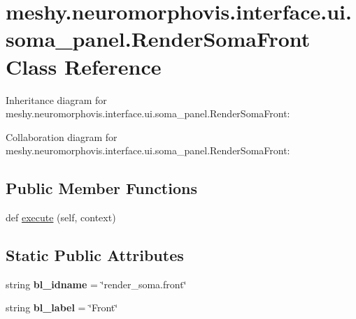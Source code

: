 \hypertarget{classmeshy_1_1neuromorphovis_1_1interface_1_1ui_1_1soma__panel_1_1RenderSomaFront}{}\section{meshy.\+neuromorphovis.\+interface.\+ui.\+soma\+\_\+panel.\+Render\+Soma\+Front Class Reference}
\label{classmeshy_1_1neuromorphovis_1_1interface_1_1ui_1_1soma__panel_1_1RenderSomaFront}


Inheritance diagram for meshy.\+neuromorphovis.\+interface.\+ui.\+soma\+\_\+panel.\+Render\+Soma\+Front\+:


Collaboration diagram for meshy.\+neuromorphovis.\+interface.\+ui.\+soma\+\_\+panel.\+Render\+Soma\+Front\+:
\subsection*{Public Member Functions}
\begin{DoxyCompactItemize}
\item 
def \hyperlink{classmeshy_1_1neuromorphovis_1_1interface_1_1ui_1_1soma__panel_1_1RenderSomaFront_a16b3b1a09fa55e2f3b6d4f988ef8285d}{execute} (self, context)
\end{DoxyCompactItemize}
\subsection*{Static Public Attributes}
\begin{DoxyCompactItemize}
\item 
string {\bfseries bl\+\_\+idname} = \char`\"{}render\+\_\+soma.\+front\char`\"{}\hypertarget{classmeshy_1_1neuromorphovis_1_1interface_1_1ui_1_1soma__panel_1_1RenderSomaFront_ab729d8cb5bf7e447340bcb9b4019cf9a}{}\label{classmeshy_1_1neuromorphovis_1_1interface_1_1ui_1_1soma__panel_1_1RenderSomaFront_ab729d8cb5bf7e447340bcb9b4019cf9a}

\item 
string {\bfseries bl\+\_\+label} = \char`\"{}Front\char`\"{}\hypertarget{classmeshy_1_1neuromorphovis_1_1interface_1_1ui_1_1soma__panel_1_1RenderSomaFront_a0045a308ba2892b0312bbb9097361d7c}{}\label{classmeshy_1_1neuromorphovis_1_1interface_1_1ui_1_1soma__panel_1_1RenderSomaFront_a0045a308ba2892b0312bbb9097361d7c}

\end{DoxyCompactItemize}



